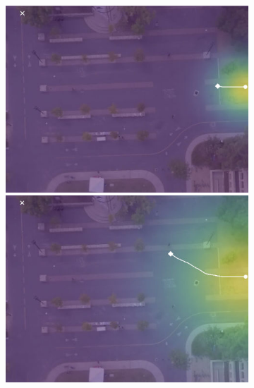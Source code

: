 \documentclass[letterpaper,10pt,conference]{ieeetran}
\begin{document}
\begin{figure}[t!]
\begin{subfigure}[t]{0.48\textwidth}
	\vspace{0.1cm}
	\begin{minipage}[c]{0.47cm}
	\end{minipage}
	\begin{minipage}[c]{0.3\linewidth}
		\includegraphics[width=\linewidth]{./figures/bookstore/rand_1_2_t=50.jpg}
	\end{minipage}
	\begin{minipage}[c]{0.3\linewidth}
		\includegraphics[width=\linewidth]{./figures/bookstore/rand_1_2_t=130.jpg}
	\end{minipage}
	\begin{minipage}[c]{0.3\linewidth}

\end{minipage}
\end{subfigure}
\end{figure}
\end{document}
